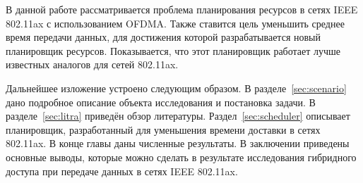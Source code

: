 В данной работе рассматривается проблема планирования ресурсов в сетях IEEE 802.11ax с использованием OFDMA. Также ставится цель уменьшить среднее время передачи данных, для достижения которой разрабатывается новый планировщик ресурсов. Показывается, что этот планировщик работает лучше известных аналогов для сетей 802.11ax.

Дальнейшее изложение устроено следующим образом. В разделе~\ref{sec:scenario} дано подробное описание объекта исследования и постановка задачи.
В разделе~\ref{sec:litra} приведён обзор литературы.
Раздел~\ref{sec:scheduler} описывает планировщик, разработанный для уменьшения времени доставки в сетях 802.11ax. В конце главы даны численные результаты. В заключении приведены основные выводы, которые можно сделать в результате исследования гибридного доступа при передаче данных в сетях IEEE 802.11ax.